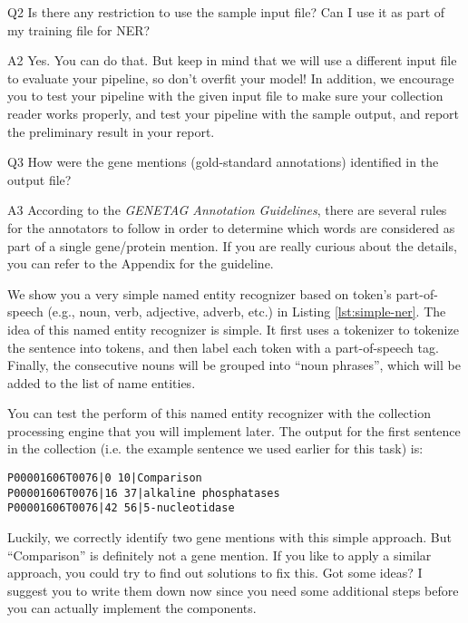 \begin{qa}
\item[Q2] Is there any restriction to use the sample input file? Can I use it
as part of my training file for NER?

\item[A2] Yes. You can do that. But keep in mind that we will use a different
input file to evaluate your pipeline, so don't overfit your model! In addition,
we encourage you to test your pipeline with the given input file to make sure
your collection reader works properly, and test your pipeline with the sample
output, and report the preliminary result in your report.

\item[Q3] How were the gene mentions (gold-standard annotations) identified in
the output file?

\item[A3] According to the \emph{GENETAG Annotation Guidelines}, there are
several rules for the annotators to follow in order to determine which words are
considered as part of a single gene/protein mention. If you are really curious
about the details, you can refer to the Appendix for the guideline.

\end{qa}

We show you a very simple named entity recognizer based on token's
part-of-speech (e.g., noun, verb, adjective, adverb, etc.) in Listing
\ref{lst:simple-ner}. The idea of this named entity recognizer is simple. It
first uses a tokenizer to tokenize the sentence into tokens, and then label each
token with a part-of-speech tag.
Finally, the consecutive nouns will be grouped into ``noun phrases'', which will
be added to the list of name entities.

\small

\normalsize

You can test the perform of this named entity recognizer with the collection
processing engine that you will implement later. The output for the first
sentence in the collection (i.e. the example sentence we used earlier for this
task) is:

\begin{verbatim}
P00001606T0076|0 10|Comparison
P00001606T0076|16 37|alkaline phosphatases
P00001606T0076|42 56|5-nucleotidase
\end{verbatim}

Luckily, we correctly identify two gene mentions with this simple approach. But
``Comparison'' is definitely not a gene mention. If you like to apply a similar
approach, you could try to find out solutions to fix this. Got some ideas? I
suggest you to write them down now since you need some additional steps before
you can actually implement the components.

